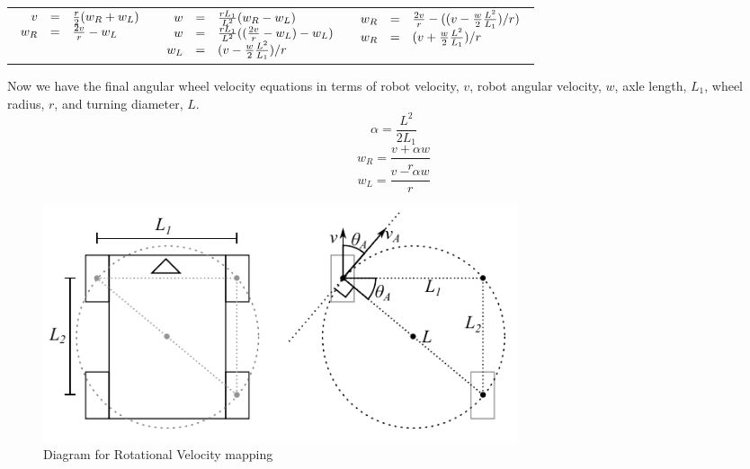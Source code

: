 \documentclass[fontsize=11pt, %
                             paper=letter, %
                             openany, %
                             captions=tableheading,
                             index=totoc,
                             hyperref]{labbook}
\begin{document}
\begin{addmargin}[0cm]{0cm}
\vspace*{-18pt}
\begin{center}
\renewcommand{\arraystretch}{1.5}
\begin{tabular}{ c | c | c }
    \begin{math}
        $$\begin{array}{rcl}
        v &=& \frac{r}{2}(w_R+w_L)\\
        w_R &=& \frac{2v}{r}-w_L
        \end{array}$$
    \end{math} &
    \begin{math}
        $$\begin{array}{rcl}
        w &=& \frac{rL_1}{L^2}(w_R-w_L)\\
        w &=& \frac{rL_1}{L^2}((\frac{2v}{r}-w_L)-w_L)\\
        w_L &=& (v - \frac{w}{2}\frac{L^2}{L_1})/r
        \end{array}$$
    \end{math} &
    \begin{math}
        $$\begin{array}{rcl}
        w_R &=& \frac{2v}{r}-((v - \frac{w}{2}\frac{L^2}{L_1})/r)\\
        w_R &=& (v + \frac{w}{2}\frac{L^2}{L_1})/r\\
        \end{array}$$
    \end{math} \\
\end{tabular}
\end{center}
\vspace*{12pt}

Now we have the final angular wheel velocity equations in terms of robot velocity, $v$, robot angular velocity, $w$, axle length, $L_1$, wheel radius, $r$, and turning diameter, $L$.
\vspace*{-6pt}
$$\alpha = \frac{L^2}{2L_1}$$
\vspace*{-12pt}
$$w_R = \frac{v + {\alpha}w}{r}$$
$$w_L = \frac{v - {\alpha}w}{r}$$

\begin{figure}
    \center
    \includegraphics[width=5.5in]{figs/roatationalVelocityMathDiagram}
    \caption{Diagram for Rotational Velocity mapping}
    \label{fig:rotMathDiagram}
\end{figure}


\end{addmargin}
\end{document}
